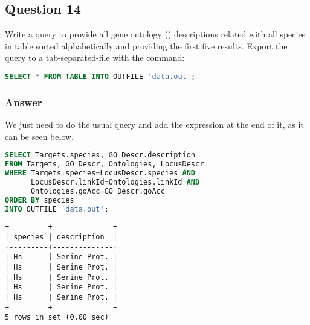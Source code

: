 

\subsection*{Question 14}
Write a query to provide all gene ontology () descriptions related with all  species in table  sorted alphabetically and providing the first five results. Export the query to a tab-separated-file with the command:

\begin{lstlisting}[language=sql]
SELECT * FROM TABLE INTO OUTFILE 'data.out';
\end{lstlisting}

\subsubsection*{Answer}
We just need to do the usual query and add the  expression at the end of it, as it can be seen below.
\begin{lstlisting}[language=sql]
SELECT Targets.species, GO_Descr.description
FROM Targets, GO_Descr, Ontologies, LocusDescr
WHERE Targets.species=LocusDescr.species AND
      LocusDescr.linkId=Ontologies.linkId AND
      Ontologies.goAcc=GO_Descr.goAcc
ORDER BY species
INTO OUTFILE 'data.out';
\end{lstlisting}

\begin{lstlisting}[style=output]
+---------+--------------+
| species | description  |
+---------+--------------+
| Hs      | Serine Prot. |
| Hs      | Serine Prot. |
| Hs      | Serine Prot. |
| Hs      | Serine Prot. |
| Hs      | Serine Prot. |
+---------+--------------+
5 rows in set (0.00 sec)
\end{lstlisting}

